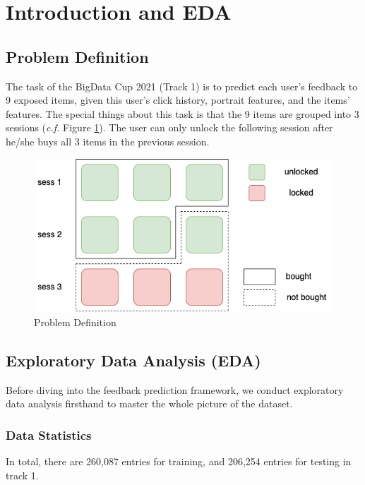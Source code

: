 \section{Introduction and EDA} \label{sec:eda}

\subsection{Problem Definition}
The task of the BigData Cup 2021 (Track 1) is to predict each user's feedback to 9 exposed items, given this user's click history, portrait features, and the items' features.
The special things about this task is that the 9 items are grouped into 3 sessions (\textit{c.f.} Figure \ref{fig:problemdef}). 
The user can only unlock the following session after he/she buys all 3 items in the previous session.


\begin{figure}[t!]
    \centering
    \includegraphics[width=\linewidth]{figures/problemdef.png}
    \caption{Problem Definition \cite{kaggle}}
    \label{fig:problemdef}
\end{figure}

%
\subsection{Exploratory Data Analysis (EDA)}
Before diving into the feedback prediction framework, we conduct exploratory data analysis firsthand to master the whole picture of the dataset.
\subsubsection{Data Statistics} \label{sec:eda:stats}

In total, there are 260,087 entries for training, and 206,254 entries for testing in track 1. 


